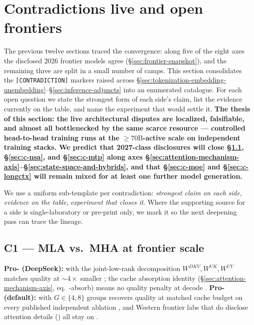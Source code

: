 
\section{Contradictions live and open frontiers}
\label{sec:contradictions}

The previous twelve sections traced the convergence: along five of the
eight axes the disclosed 2026 frontier models agree
(\S\ref{sec:frontier-snapshot}), and the remaining three are split in a
small number of camps. This section consolidates the
\texttt{[CONTRADICTION]} markers raised across
\S\ref{sec:tokenization-embedding-unembedding}--\S\ref{sec:inference-adjuncts}
into an enumerated catalogue. For each open question we state the
strongest form of each side's claim, list the evidence currently on the
table, and name the experiment that would settle it. \textbf{The thesis
of this section: the live architectural disputes are localized,
falsifiable, and almost all bottlenecked by the same scarce resource ---
controlled head-to-head training runs at the $\geq 70\mathrm{B}$-active
scale on independent training stacks. We predict that 2027-class
disclosures will close \S\ref{sec:c-mla}, \S\ref{sec:c-nsa}, and
\S\ref{sec:c-mtp} along axes
\S\ref{sec:attention-mechanism-axis}--\S\ref{sec:state-space-and-hybrids}, and that
\S\ref{sec:c-moe} and \S\ref{sec:c-longctx} will remain mixed for at
least one further model generation.}

We use a uniform sub-template per contradiction: \emph{strongest claim
on each side}, \emph{evidence on the table}, \emph{experiment that
closes it}. Where the supporting source for a side is single-laboratory
or pre-print only, we mark it \deepencite{} so the next deepening pass
can trace the lineage.

\subsection{C1 --- MLA vs.\ MHA at frontier scale}
\label{sec:c-mla}

\textbf{Pro- (DeepSeek):}  with the
joint-low-rank decomposition $W^{DKV}, W^{UK}, W^{UV}$ matches 
quality at $\sim 4\times$ smaller ; the cache absorption
identity (\S\ref{sec:attention-mechanism-axis}, eq.\ -absorb) means
no quality penalty at decode \citep[\S 2.1.4]{deepseek-v2}.
\textbf{Pro- (default):}  with $G \in \{4, 8\}$ groups recovers
 quality at matched cache budget on every published independent
ablation \citep[\S 3.1]{ainslie2023}, and Western frontier labs that do
disclose attention details (\citealp{meta-llama3, meta-llama4,
gemma3, qwen3}) all stay on .

